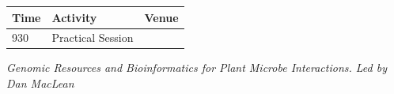 \documentclass[12pt,]{book}
\begin{document}
\begin{longtable}[]{@{}lll@{}}
\toprule
\begin{minipage}[b]{0.09\columnwidth}\raggedright\strut
Time\strut
\end{minipage} & \begin{minipage}[b]{0.23\columnwidth}\raggedright\strut
Activity\strut
\end{minipage} & \begin{minipage}[b]{0.09\columnwidth}\raggedright\strut
Venue\strut
\end{minipage}\tabularnewline
\midrule
\endhead
\begin{minipage}[t]{0.09\columnwidth}\raggedright\strut
930\strut
\end{minipage} & \begin{minipage}[t]{0.23\columnwidth}\raggedright\strut
Practical Session\strut
\end{minipage} & \begin{minipage}[t]{0.09\columnwidth}\raggedright\strut
\strut
\end{minipage}\tabularnewline
\bottomrule
\end{longtable}

\emph{Genomic Resources and Bioinformatics for Plant Microbe
Interactions. Led by Dan MacLean}
\end{document}
